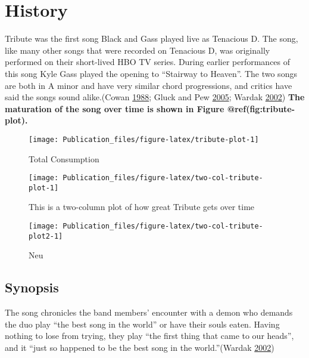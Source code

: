 \hypertarget{history}{%
\section{History}\label{history}}

Tribute was the first song Black and Gass played live as Tenacious D.
The song, like many other songs that were recorded on Tenacious D, was
originally performed on their short-lived HBO TV series. During earlier
performances of this song Kyle Gass played the opening to ``Stairway to
Heaven''. The two songs are both in A minor and have very similar chord
progressions, and critics have said the songs sound alike.(Cowan
\protect\hyperlink{ref-Cowan1988}{1988}; Gluck and Pew
\protect\hyperlink{ref-Gluck2005}{2005}; Wardak
\protect\hyperlink{ref-Wardak2002}{2002}) \textbf{The maturation of the
song over time is shown in Figure @ref(fig:tribute-plot).}

\begin{figure}
\texttt{[image: Publication\_files/figure-latex/tribute-plot-1]} \caption{Total Consumption}\label{fig:tribute-plot}
\end{figure}

\begin{figure*}
\texttt{[image: Publication\_files/figure-latex/two-col-tribute-plot-1]} \caption{This is a two-column plot of how great Tribute gets over time}\label{fig:two-col-tribute-plot}
\end{figure*}

\begin{figure*}
\texttt{[image: Publication\_files/figure-latex/two-col-tribute-plot2-1]} \caption{Neu}\label{fig:two-col-tribute-plot2}
\end{figure*}

\hypertarget{synopsis}{%
\subsection{Synopsis}\label{synopsis}}

The song chronicles the band members' encounter with a demon who demands
the duo play ``the best song in the world'' or have their souls eaten.
Having nothing to lose from trying, they play ``the first thing that
came to our heads'', and it ``just so happened to be the best song in
the world.''(Wardak \protect\hyperlink{ref-Wardak2002}{2002})

